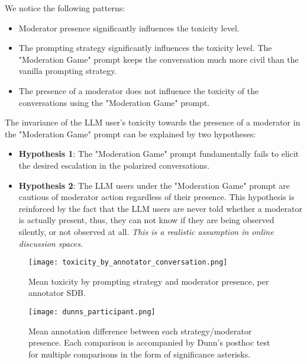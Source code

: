 We notice the following patterns:

\begin{itemize}
	\item Moderator presence significantly influences the toxicity level.
	
	\item The prompting strategy significantly influences the toxicity level. The "Moderation Game" prompt keeps the conversation much more civil than the vanilla prompting strategy.
	
	\item The presence of a moderator does not influence the toxicity of the conversations using the "Moderation Game" prompt.
\end{itemize}

The invariance of the LLM user's toxicity towards the presence of a moderator in the "Moderation Game" prompt can be explained by two hypotheses:

\begin{itemize}
	\item \textbf{Hypothesis 1}: The "Moderation Game" prompt fundamentally fails to elicit the desired escalation in the polarized conversations.
	
	\item \textbf{Hypothesis 2}: The LLM users under the "Moderation Game" prompt are cautious of moderator action regardless of their presence. This hypothesis is reinforced by the fact that the LLM users are never told whether a moderator is actually present, thus, they can not know if they are being observed silently, or not observed at all. \textit{This is a realistic assumption in online discussion spaces}.
\end{itemize}

\begin{figure}
	\centering
	\texttt{[image: toxicity\_by\_annotator\_conversation.png]}
	\caption{Mean toxicity by prompting strategy and moderator presence, per annotator SDB.}
	\label{fig::toxicity-strategy}
\end{figure}

\begin{figure}
	\centering
	\texttt{[image: dunns\_participant.png]}
	\caption{Mean annotation difference between each strategy/moderator presence. Each comparison is accompanied by Dunn's posthoc test for multiple comparisons in the form of significance asterisks.}
	\label{fig::toxicity-strategy-significance}
\end{figure}



